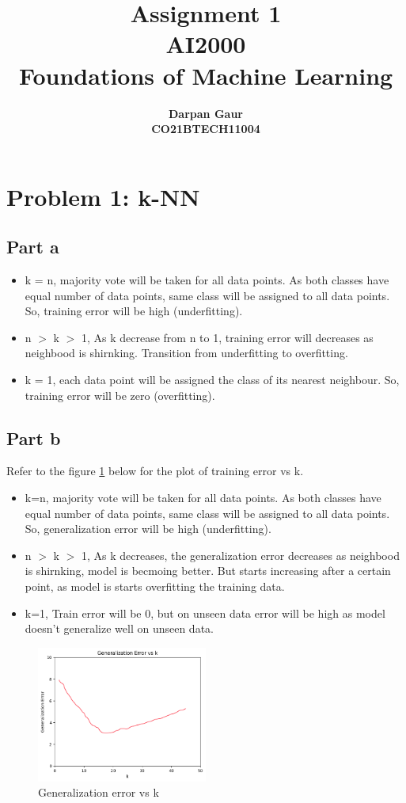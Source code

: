 \documentclass[12pt]{article}
\title{
    \textbf{Assignment 1} \\ 
    \textbf{AI2000} \\
    \textbf{Foundations of Machine Learning}
}
\author{
    \textbf{Darpan Gaur} \\
    \textbf{CO21BTECH11004}
}
\date{}
\begin{document}
\maketitle

\hrulefill

\section*{Problem 1: k-NN}
\subsection*{Part a}
\begin{itemize}
    \item k = n, majority vote will be taken for all data points. As both classes have equal number of data points, 
          same class will be assigned to all data points. So, training error will be high (underfitting).
    \item n $>$ k $>$ 1, As k decrease from n to 1, training error will decreases as neighbood is shirnking. Transition from underfitting to overfitting.
    \item k = 1, each data point will be assigned the class of its nearest neighbour. So, training error will be zero (overfitting).
\end{itemize}
\subsection*{Part b}
Refer to the figure \hyperref[fig: Figure 1]{1} below for the plot of training error vs k.
\begin{itemize}
    \item k=n, majority vote will be taken for all data points. As both classes have equal number of data points, 
          same class will be assigned to all data points. So, generalization error will be high (underfitting).
    \item n $>$ k $>$ 1, As k decreases, the generalization error decreases as neighbood is shirnking, model is becmoing better.
            But starts increasing after a certain point, as model is starts overfitting the training data.
    \item k=1, Train error will be 0, but on unseen data error will be high as model doesn't generalize well on unseen data.
\end{itemize}

\begin{figure}[h]
    \centering
    \label{fig: Figure 1}
    \includegraphics[width=0.5\textwidth]{../generalizationError.png}
    \caption{Generalization error vs k}
\end{figure}
\end{document}
